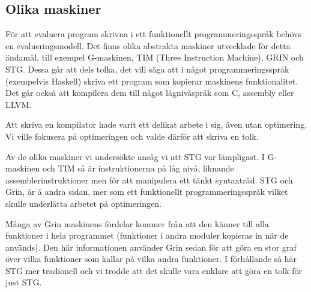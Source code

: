 \documentclass[../Core]{subfiles}
\begin{document}
\subsection{Olika maskiner}
För att evaluera program skrivna i ett funktionellt programmeringsspråk
behövs en evalueringsmodell. Det finns olika abstrakta maskiner utvecklade för
detta ändamål, till exempel G-maskinen, TIM (Three Instruction Machine), GRIN \cite{grin} och STG.
Dessa går att dels tolka, det vill säga att i något programmeringsspråk (exempelvis
Haskell) skriva ett program som kopierar maskinens funktionalitet. Det går också att
kompilera dem till något lågnivåspråk som C, assembly eller LLVM.

Att skriva en kompilator hade varit ett delikat arbete i sig, även utan
optimering. Vi ville fokusera på optimeringen och valde därför att skriva en tolk.

Av de olika maskiner vi undersökte ansåg vi att STG var lämpligast. I G-maskinen och TIM så är
instruktionerna på låg nivå, liknande assemblerinstruktioner men för att manipulera
ett tänkt syntaxträd. STG och Grin, är å andra sidan, mer som ett funktionellt
programmeringsspråk vilket skulle underlätta arbetet på optimeringen.

Många av Grin maskinens fördelar kommer från att den känner till alla funktioner i hela
programmet (funktioner i andra moduler kopieras in när de används). Den här informationen
använder Grin sedan för att göra en stor graf över vilka funktioner som kallar på
vilka andra funktioner. I förhållande så här STG mer tradionell och vi trodde att det skulle
vara enklare att göra en tolk för just STG.
\end{document}

